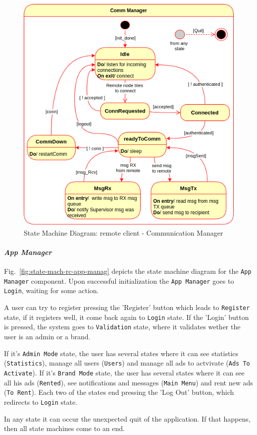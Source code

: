 \begin{figure}[htb!]
\centering
    \includegraphics[width=0.5\columnwidth]{./img/state-mach-rc-comm.png}
  \caption{State Machine Diagram: remote client - Communication Manager}%
\label{fig:state-mach-rc-comm}
\end{figure}
%

\paragraph{\emph{App Manager}}
Fig.~\ref{fig:state-mach-rc-app-manag} depicts the state machine diagram for the
\texttt{App Manager} component.
Upon successful initialization the
\texttt{App Manager} goes to \texttt{Login}, waiting for some action. 

A user can try to register pressing the 'Register' button which leads to \texttt{Register} state, if it registers well, it come back again to \texttt{Login} state. 
If the 'Login' button is pressed, the system goes to \texttt{Validation} state, where it validates wether the user is an admin or a brand.

If it's \texttt{Admin Mode} state, the user has several states where it can see statistics (\texttt{Statistics}), manage all users (\texttt{Users}) and manage all ads to actvivate (\texttt{Ads To Activate}).
If it's \texttt{Brand Mode} state, the user has several states where it can see all his ads (\texttt{Rented}), see notifications and messages (\texttt{Main Menu}) and rent new ads (\texttt{To Rent}). 
Each two of the states end pressing the 'Log Out' button, which redirects to \texttt{Login}  state.

In any state it can occur the unexpected quit of the application. If that happens, then all state machines come to an end.  

